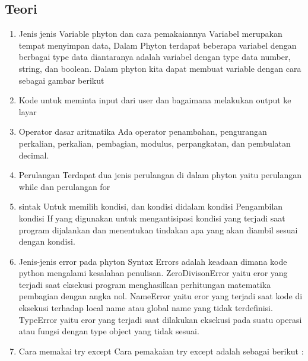 \subsection{Teori}
\begin{enumerate}
    \item Jenis jenis Variable phyton dan cara pemakaiannya 
Variabel merupakan tempat menyimpan data, Dalam Phyton terdapat beberapa variabel dengan berbagai type data diantaranya adalah variabel dengan type data number, string, dan boolean. Dalam phyton kita dapat membuat variable dengan cara sebagai gambar berikut
   
    \item Kode untuk meminta input dari user dan bagaimana melakukan output ke layar
 
    \item Operator dasar aritmatika
Ada operator penambahan, pengurangan perkalian, perkalian, pembagian, modulus, perpangkatan, dan pembulatan decimal.

    \item Perulangan
Terdapat dua jenis perulangan di dalam phyton yaitu perulangan while dan perulangan for
 
 
    \item sintak Untuk memilih kondisi, dan kondisi didalam kondisi
Pengambilan kondisi If yang digunakan untuk mengantisipasi kondisi yang terjadi saat program dijalankan dan menentukan tindakan apa yang akan diambil sesuai dengan kondisi.
  
  
  

    \item Jenis-jenis error pada phyton
Syntax Errors adalah keadaan dimana kode python mengalami kesalahan penulisan. 
ZeroDivisonError yaitu eror yang terjadi saat eksekusi program menghasilkan perhitungan matematika pembagian dengan angka nol.
NameError yaitu eror yang terjadi saat kode di eksekusi terhadap local name atau global name yang tidak terdefinisi. 
TypeError yaitu eror yang terjadi saat dilakukan eksekusi pada suatu operasi atau fungsi dengan type object yang tidak sesuai.

    \item Cara memakai try except
Cara pemakaian try except adalah sebagai berikut :


\end{enumerate}

